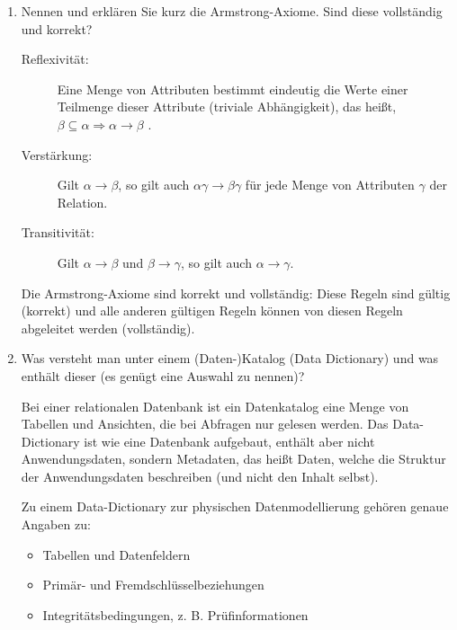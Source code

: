 \documentclass{lehramt-informatik-aufgabe}
\begin{document}
\begin{enumerate}
\item Nennen und erklären Sie kurz die Armstrong-Axiome. Sind diese
vollständig und korrekt?

\begin{liAntwort}

\begin{description}
\item[Reflexivität:]
%
Eine Menge von Attributen bestimmt eindeutig die Werte einer Teilmenge
dieser Attribute (triviale Abhängigkeit), das heißt,
$\beta \subseteq \alpha \Rightarrow \alpha \rightarrow \beta$ .

\item[Verstärkung:]
%
Gilt
$\alpha \rightarrow \beta$, so gilt auch
$\alpha \gamma \rightarrow \beta \gamma$
für jede Menge von Attributen
$\gamma$ der
Relation.

\item[Transitivität:]
%
Gilt
$\alpha \rightarrow \beta$
und
$\beta \rightarrow \gamma$,
so gilt auch
$\alpha \rightarrow \gamma$.
\end{description}

Die Armstrong-Axiome sind korrekt und vollständig: Diese
Regeln sind gültig (korrekt) und alle anderen gültigen Regeln können von
diesen Regeln abgeleitet werden (vollständig).
\end{liAntwort}


\item Was versteht man unter einem (Daten-)Katalog (Data Dictionary)
und was enthält dieser (es genügt eine Auswahl zu nennen)?

\begin{liAntwort}
Bei einer relationalen Datenbank ist ein Datenkatalog eine Menge von
Tabellen und Ansichten, die bei Abfragen  nur
gelesen werden. Das Data-Dictionary ist wie eine Datenbank
aufgebaut, enthält aber nicht Anwendungsdaten, sondern Metadaten, das
heißt Daten, welche die Struktur der Anwendungsdaten beschreiben (und
nicht den Inhalt selbst).

Zu einem Data-Dictionary zur physischen Datenmodellierung gehören genaue Angaben zu:

\begin{itemize}
\item Tabellen und Datenfeldern
\item Primär- und Fremdschlüsselbeziehungen
\item Integritätsbedingungen, z. B. Prüfinformationen
\end{itemize}
\end{liAntwort}


\end{enumerate}
\end{document}
